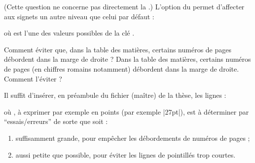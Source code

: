 (Cette question ne concerne pas directement la \yatCl{}.) L'option
 du  permet d'affecter aux signets un autre
niveau que celui par défaut :
\begin{preamblecode}[title=Par exemple dans le \File{\configurationfile}]
\end{preamblecode}
où  est l'une des valeurs possibles de la clé .

\begin{dbfaq}{Comment éviter que, dans la table des matières, certains numéros
    de pages débordent dans la marge de droite ?}{}
  Dans la table des matières, certains numéros de pages (en chiffres romains
  notamment) débordent dans la marge de droite. Comment l'éviter ?
\end{dbfaq}

Il suffit d'insérer, en préambule du fichier (maître) de la thèse, les lignes :
\begin{preamblecode}[title=Par exemple dans le \File{\configurationfile}]
\makeatletter
\renewcommand*\@pnumwidth{"\meta{distance}"}
\makeatother
\end{preamblecode}
où , à exprimer par exemple en points (par exemple |27pt|), est
à déterminer par \enquote{essais/erreurs} de sorte que  soit :
\begin{enumerate}
\item suffisamment grande, pour empêcher les débordements de numéros de pages ;
\item aussi petite que possible, pour éviter les lignes de pointillés trop
  courtes.
\end{enumerate}

\subsection[Titres
courants]{\texorpdfstring{}{Titres courants}}
\label{sec-titres-courants}

